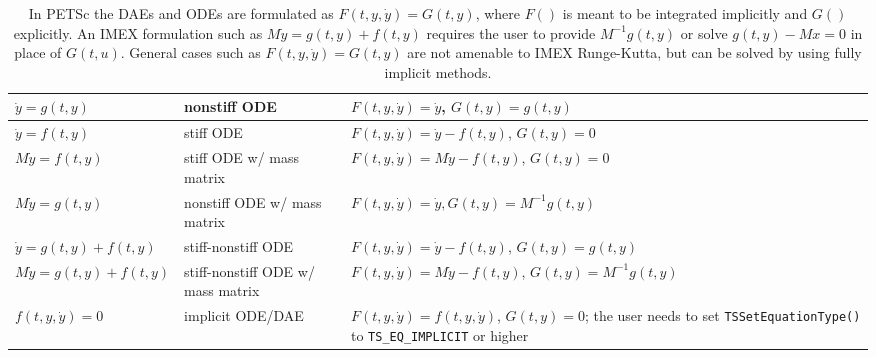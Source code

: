 %
\begin{table}
\centering
\caption{\label{tab:DE:forms}In PETSc the DAEs and ODEs are formulated
as $F(t,y,\dot{y})=G(t,y)$, where $F()$ is meant to be integrated
implicitly and $G()$ explicitly. An IMEX formulation such as
$M\dot{y}=g(t,y)+f(t,y)$ requires the user to provide $M^{-1} g(t,y)$ or
solve  $g(t,y) - M x=0$ in place of $G(t,u)$. General cases such as
$F(t,y,\dot{y})=G(t,y)$ are
not amenable to IMEX Runge-Kutta, but can be solved by using fully implicit methods.}

\begin{tabular}{|l|p{1.7in}|p{2.8in}|}
\hline
$\dot{y}=g(t,y)$ & nonstiff ODE & $F(t,y,\dot{y}) = \dot{y}$,
$G(t,y)=g(t,y)$\\
\hline
$\dot{y}=f(t,y)$ & stiff ODE & $F(t,y,\dot{y}) =  \dot{y}-f(t,y)$,
$G(t,y)=0$\\
\hline
$M \dot{y}=f(t,y)$ & stiff ODE w/ mass matrix& $F(t,y,\dot{y}) = M \dot{y}-f(t,y)$,
$G(t,y)=0$\\
\hline
$M \dot{y} = g(t,y)$& nonstiff ODE w/ mass matrix&$F(t,y,\dot{y}) = \dot{y}, G(t,y) = M^{-1} g(t,y)$\\
\hline
$\dot{y}=g(t,y)+f(t,y)$ & stiff-nonstiff ODE & $F(t,y,\dot{y}) = \dot{y}-f(t,y)$, $G(t,y)=g(t,y)$\\
\hline
$M\dot{y}=g(t,y)+f(t,y)$ & stiff-nonstiff ODE w/ mass matrix & $F(t,y,\dot{y}) = M \dot{y}-f(t,y)$, $G(t,y)=M^{-1}g(t,y)$\\
\hline
  $f(t,y,\dot{y})=0$       & implicit ODE/DAE                  & $F(t,y,\dot{y}) = f(t,y,\dot{y})$, $G(t,y) = 0$; the user needs to set \lstinline|TSSetEquationType()| to \lstinline|TS_EQ_IMPLICIT| or higher\\
\hline
\end{tabular}
\end{table}

